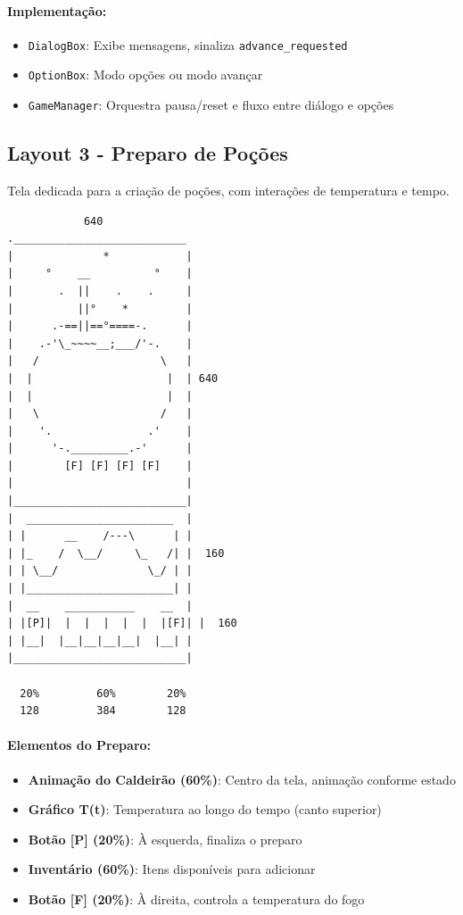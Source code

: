 \documentclass[12pt]{article}
\newcommand{\fogo}{\textbf{[F]}}
\newcommand{\pocao}{\textbf{[P]}}
\begin{document}
\paragraph{Implementação:}
\begin{itemize}
    \item \texttt{DialogBox}: Exibe mensagens, sinaliza \texttt{advance\_requested}
    \item \texttt{OptionBox}: Modo opções ou modo avançar
    \item \texttt{GameManager}: Orquestra pausa/reset e fluxo entre diálogo e opções
\end{itemize}

\subsection{Layout 3 - Preparo de Poções}

Tela dedicada para a criação de poções, com interações de temperatura e tempo.

\begin{verbatim}
            640
.___________________________
|              *            |
|     °    __          °    |
|       .  ||    .    .     |
|          ||°    *         |
|      .-==||==°====-.      |
|    .-'\_~~~~__;___/'-.    |
|   /                   \   |
|  |                     |  | 640
|  |                     |  |
|   \                   /   |
|    '.               .'    |
|      '-._________.-'      |
|        [F] [F] [F] [F]    |
|                           |
|___________________________|
|  _______________________  |
| |      __    /---\      | |
| |_    /  \__/     \_   /| |  160
| | \__/              \_/ | |
| |_______________________| |
|  __    ___________    __  |
| |[P]|  |  |  |  |  |  |[F]| |  160
| |__|  |__|__|__|__|  |__| |
|___________________________|

  20%         60%        20%
  128         384        128
\end{verbatim}

\paragraph{Elementos do Preparo:}
\begin{itemize}
    \item \textbf{Animação do Caldeirão (60\%)}: Centro da tela, animação conforme estado
    \item \textbf{Gráfico T(t)}: Temperatura ao longo do tempo (canto superior)
    \item \textbf{Botão \pocao{} (20\%)}: À esquerda, finaliza o preparo
    \item \textbf{Inventário (60\%)}: Itens disponíveis para adicionar
    \item \textbf{Botão \fogo{} (20\%)}: À direita, controla a temperatura do fogo
\end{itemize}
\end{document}
